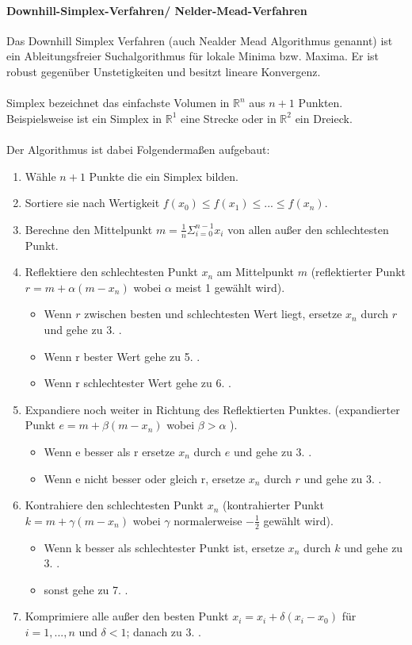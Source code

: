 				\paragraph{Downhill-Simplex-Verfahren/ Nelder-Mead-Verfahren}
					Das Downhill Simplex Verfahren (auch Nealder Mead Algorithmus genannt) ist ein Ableitungsfreier Suchalgorithmus für lokale Minima bzw. Maxima. Er ist robust gegenüber Unstetigkeiten und besitzt lineare Konvergenz.\\\\
					Simplex bezeichnet das einfachste Volumen in $\mathbb{R}^{n} $ aus $n+1$ Punkten. Beispielsweise ist ein Simplex in $\mathbb{R}^{1} $ eine Strecke oder in $\mathbb{R}^{2} $ ein Dreieck.
					\\\\
					Der Algorithmus ist dabei Folgendermaßen aufgebaut:
					\begin{enumerate}
						\item Wähle $n+1$ Punkte die ein Simplex bilden. 
						\item Sortiere sie nach Wertigkeit $ f(x_{0}) \leq f(x_{1}) \leq . . . \leq f(x_{n}) $.
						\item Berechne den Mittelpunkt $ m = \frac{1}{n}\Sigma_{i=0}^{n-1}x_{i} $ von allen außer den schlechtesten Punkt.
						\item Reflektiere den schlechtesten Punkt $ x_{n} $ am Mittelpunkt $ m $ (reflektierter Punkt $ r = m + \alpha(m-x_{n}) $ wobei $ \alpha $ meist 1 gewählt wird).
						\begin{itemize}
							\item Wenn $ r $ zwischen besten und schlechtesten Wert liegt, ersetze $ x_{n} $ durch $ r $ und gehe zu 3. .
							\item Wenn r bester Wert gehe zu 5. .
							\item Wenn r schlechtester Wert gehe zu 6. .
						\end{itemize}
						\item Expandiere noch weiter in Richtung des Reflektierten Punktes.
						(expandierter Punkt $ e = m + \beta(m-x_{n}) $ wobei $ \beta > \alpha $ ).
						\begin{itemize}
							\item Wenn e besser als r ersetze $ x_{n} $ durch $ e $ und gehe zu 3. .
							\item Wenn e nicht besser oder gleich r, ersetze $ x_{n} $ durch $ r $ und gehe zu 3. .  
						\end{itemize}
						\item Kontrahiere den schlechtesten Punkt $ x_{n} $ (kontrahierter Punkt $ k = m + \gamma(m-x_{n}) $ wobei $ \gamma $ normalerweise $ -\frac{1}{2} $ gewählt wird).
						\begin{itemize}
							\item Wenn k besser als schlechtester Punkt ist, ersetze $ x_{n} $ durch $ k $ und gehe zu 3. . 
							\item sonst gehe zu 7. .
						\end{itemize}
						\item Komprimiere alle außer den besten Punkt $ x_{i} = x_{i} + \delta(x_{i} - x_{0}) $ für $ i = 1,...,n $ und $ \delta < 1 $; danach zu 3. .
					\end{enumerate}
